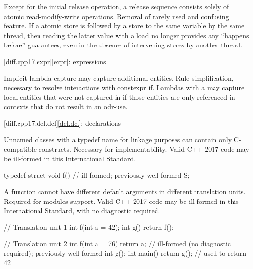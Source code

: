 \change
Except for the initial release operation,
a release sequence consists solely of atomic read-modify-write operations.
\rationale
Removal of rarely used and confusing feature.
\effect
If a  atomic store is followed
by a  store to the same variable by the same thread,
then reading the latter value with a  load
no longer provides any ``happens before'' guarantees,
even in the absence of intervening stores by another thread.

[diff.cpp17.expr]{\ref{expr}: expressions}

\change
Implicit lambda capture may capture additional entities.
\rationale
Rule simplification, necessary to resolve interactions with constexpr if.
\effect
Lambdas with a 
may capture local entities
that were not captured in \CppXVII{}
if those entities are only referenced in contexts
that do not result in an odr-use.

[diff.cpp17.dcl.dcl]{\ref{dcl.dcl}: declarations}

\change
Unnamed classes with a typedef name for linkage purposes
can contain only C-compatible constructs.
\rationale
Necessary for implementability.
\effect
Valid C++ 2017 code may be ill-formed in this International Standard.
\begin{codeblock}
typedef struct {
  void f() {}           // ill-formed; previously well-formed
} S;
\end{codeblock}

\change
A function cannot have different default arguments
in different translation units.
\rationale
Required for modules support.
\effect
Valid C++ 2017 code may be ill-formed in this International Standard,
with no diagnostic required.
\begin{codeblock}
// Translation unit 1
int f(int a = 42);
int g() { return f(); }

// Translation unit 2
int f(int a = 76) { return a; }         // ill-formed (no diagnostic required); previously well-formed
int g();
int main() { return g(); }              // used to return 42
\end{codeblock}

